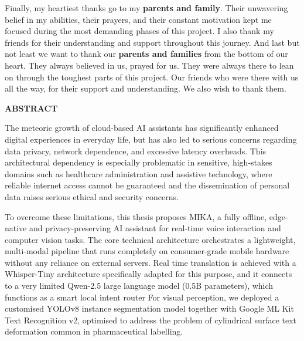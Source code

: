 \documentclass[12pt,a4paper]{report}
\begin{document}
\noindent Finally, my heartiest thanks go to my \textbf{parents and family}. Their unwavering belief in my abilities, their prayers, and their constant motivation kept me focused during the most demanding phases of this project. I also thank my friends for their understanding and support throughout this journey.
\noindent And last but not least we want to thank our \textbf{parents and families} from the bottom of our heart. They always believed in us, prayed for us. They were always there to lean on through the toughest parts of this project. Our friends who were there with us all the way, for their support and understanding. We also wish to thank them.\vspace{1.5cm}
\clearpage
\pagestyle{logoheader}
\thispagestyle{logoheader}

\begin{center}
    \vspace{1cm} %
    {\Large \textbf{ABSTRACT}}\\
    \vspace{0.4cm}
    
\end{center}


\noindent The meteoric growth of cloud-based AI assistants has significantly enhanced digital experiences in everyday life, but has also led to serious concerns regarding data privacy, network dependence, and excessive latency overheads. This architectural dependency is especially problematic in sensitive, high-stakes domains such as healthcare administration and assistive technology, where reliable internet access cannot be guaranteed and the dissemination of personal data raises serious ethical and security concerns. 

\noindent To overcome these limitations, this thesis proposes MIKA, a fully offline, edge-native and privacy-preserving AI assistant for real-time voice interaction and computer vision tasks. The core technical architecture orchestrates a lightweight, multi-modal pipeline that runs completely on consumer-grade mobile hardware without any reliance on external servers. Real time translation is achieved with a Whisper-Tiny architecture specifically adapted for this purpose, and it connects to a very limited Qwen-2.5 large language model (0.5B parameters), which functions as a smart local intent router For visual perception, we deployed a customised YOLOv8 instance segmentation model together with Google ML Kit Text Recognition v2, optimised to address the problem of cylindrical surface text deformation common in pharmaceutical labelling.
\end{document}
